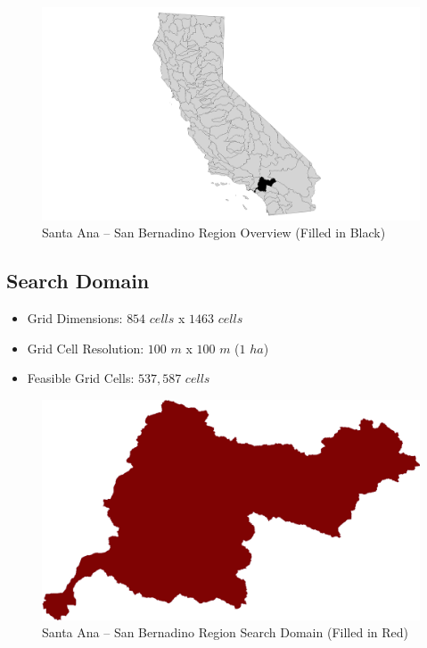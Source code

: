         \begin{figure}[!h]
            \begin{center}
            \includegraphics[width=5.5in]{figures/SanBernadino_Overview.png}   
            \caption{Santa Ana -- San Bernadino Region Overview (Filled in Black)}
            \label{fig:SASBoverview}
            \end{center}
        \end{figure}

    \subsection{Search Domain}
    
    \begin{itemize}
      \setlength{\itemsep}{0cm}
      \setlength{\parskip}{0cm}
        \item Grid Dimensions: $854$ $cells$ x $1463$ $cells$
        \item Grid Cell Resolution: $100$ $m$ x $100$ $m$ ($1$ $ha$)
        \item Feasible Grid Cells: $537,587$ $cells$
    \end{itemize}
    
        \begin{figure}[!h]
            \begin{center}
            \includegraphics[width=5.5in]{figures/SanBernadino_SearchDomain.png}   
            \caption{Santa Ana -- San Bernadino Region Search Domain (Filled in Red)}
            \label{fig:SASBdomain}
            \end{center}
        \end{figure}
        
